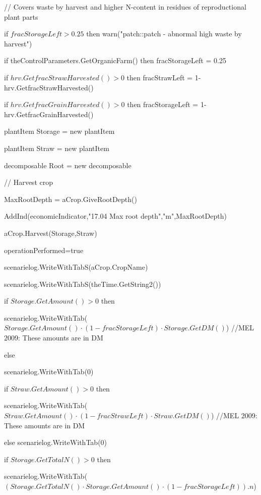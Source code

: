 \documentclass[%
]{scrartcl}
\begin{document}
{{{// Covers waste by harvest and higher N-content in residues of reproductional plant parts
      
   

if $fracStorageLeft>0.25$ then
           warn("patch::patch - abnormal high waste by harvest")
      
   if theControlParameters.GetOrganicFarm() then
            fracStorageLeft = 0.25
       
  if $hrv.GetfracStrawHarvested()>0$ then
            fracStrawLeft = 1-hrv.GetfracStrawHarvested()
        
 if $hrv.GetfracGrainHarvested()>0$ then
            fracStorageLeft = 1-hrv.GetfracGrainHarvested()

         plantItem   Storage = new plantItem
         
plantItem   Straw = new plantItem
        
 decomposable   Root = new decomposable

         // Harvest crop
        
   MaxRootDepth = aCrop.GiveRootDepth()
    
             AddInd(economicIndicator,"17.04 Max root depth","m",MaxRootDepth)

      
   aCrop.Harvest(Storage,Straw)
        
 operationPerformed=true

         scenarielog.WriteWithTabS(aCrop.CropName)
      
   scenarielog.WriteWithTabS(theTime.GetString2())
     
    if $Storage.GetAmount()>0$ then

                	 scenarielog.WriteWithTab($Storage.GetAmount() \cdot (1-fracStorageLeft) \cdot Storage.GetDM()$)   
 //MEL 2009: These amounts are in DM
               
 else
               	 	
scenarielog.WriteWithTab(0)
       
         if $Straw.GetAmount() > 0$ then
               	 	
 scenarielog.WriteWithTab($Straw.GetAmount() \cdot (1-fracStrawLeft) \cdot Straw.GetDM()$)          //MEL 2009: These amounts are in DM
               
 else scenarielog.WriteWithTab(0)
         
       if $Storage.GetTotalN() > 0$ then
               	 	
 scenarielog.WriteWithTab($(Storage.GetTotalN() \cdot Storage.GetAmount() \cdot (1-fracStorageLeft)).n$)
              
}}}
\end{document}
